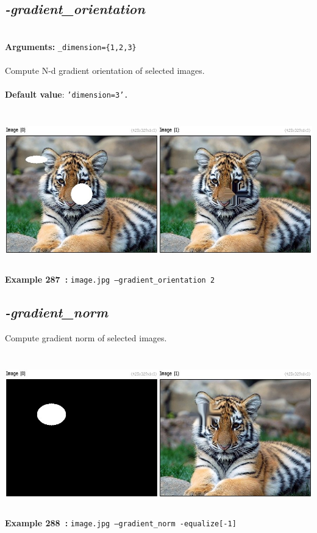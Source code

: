\documentclass[a4paper,11pt,twoside]{book}
\begin{document}
\subsection{\emph{-gradient\_orientation} }\vspace*{-0.5em}
~\\\textbf{Arguments: } 
{\small \texttt{\_dimension=\{1,2,3\}}}\\~\\
Compute N-d gradient orientation of selected images.
~\\~\\\textbf{Default value}: {\small \texttt{'dimension=3'.}}
\begin{center}\includegraphics[keepaspectratio=true,height=7cm,width=\textwidth]{img/gmic_def287.jpg}\\
{\footnotesize \textbf{Example 287~:} \texttt{image.jpg --gradient\_orientation 2}}
\end{center}

\subsection{\emph{-gradient\_norm} }\vspace*{-0.5em}
Compute gradient norm of selected images.
\begin{center}\includegraphics[keepaspectratio=true,height=7cm,width=\textwidth]{img/gmic_def288.jpg}\\
{\footnotesize \textbf{Example 288~:} \texttt{image.jpg --gradient\_norm -equalize[-1]}}
\end{center}
\end{document}
